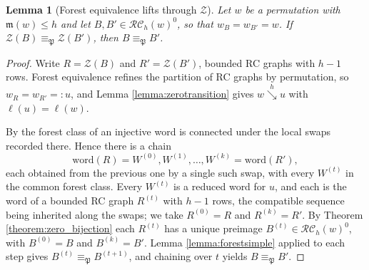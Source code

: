 \documentclass{amsart}
\newtheorem{lemma}{Lemma}[subsection]
\theoremstyle{definition}
\theoremstyle{remark}
\numberwithin{equation}{subsection}
\newcommand{\downvar}[1]{\stackrel{#1}{\searrow}}
\newcommand{\wof}[1]{w_{#1}}
\newcommand{\zeromap}{\mathcal{Z}}
\newcommand{\RC}{\mathcal{RC}}
\newcommand{\forest}{\mathfrak{P}}
\newcommand{\maxd}{\mathfrak{m}}
\begin{document}
\begin{lemma}[Forest equivalence lifts through $\zeromap$]\label{lemma:forestlift}
Let $w$ be a permutation with $\maxd(w)\leq h$ and let $B,B'\in\RC_h(w)^0$, so that $\wof B=\wof{B'}=w$. If $\zeromap(B)\equiv_\forest\zeromap(B')$, then $B\equiv_\forest B'$.
\end{lemma}
\begin{proof}
Write $R=\zeromap(B)$ and $R'=\zeromap(B')$, bounded RC graphs with $h-1$ rows. Forest equivalence refines the partition of RC graphs by permutation, so $\wof R=\wof{R'}=:u$, and Lemma \ref{lemma:zerotransition} gives $w\downvar{h}u$ with $\ell(u)=\ell(w)$.

By \cite[Proposition~5.8]{nadeau2024forest} the forest class of an injective word is connected under the local swaps recorded there. Hence there is a chain
$$\mathrm{word}(R)=W^{(0)},W^{(1)},\ldots,W^{(k)}=\mathrm{word}(R'),$$
each obtained from the previous one by a single such swap, with every $W^{(t)}$ in the common forest class. Every $W^{(t)}$ is a reduced word for $u$, and each is the word of a bounded RC graph $R^{(t)}$ with $h-1$ rows, the compatible sequence being inherited along the swaps; we take $R^{(0)}=R$ and $R^{(k)}=R'$. By Theorem \ref{theorem:zero_bijection} each $R^{(t)}$ has a unique preimage $B^{(t)}\in\RC_h(w)^0$, with $B^{(0)}=B$ and $B^{(k)}=B'$. Lemma \ref{lemma:forestsimple} applied to each step gives $B^{(t)}\equiv_\forest B^{(t+1)}$, and chaining over $t$ yields $B\equiv_\forest B'$.
\end{proof}
\end{document}
